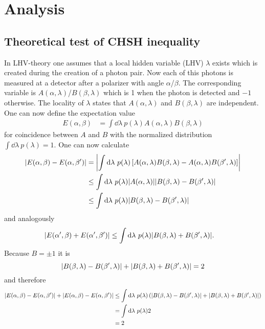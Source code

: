 \section{Analysis}
\subsection{Theoretical test of CHSH inequality}
In LHV-theory one assumes that a local hidden variable (LHV) $\lambda$ exists which is created during the creation of a photon pair.
Now each of this photons is measured at a detector after a polarizer with angle $\alpha$/$\beta$.
The corresponding variable is $A(\alpha,\lambda)$/$B(\beta,\lambda)$ which is 1 when the photon is detected and $-1$ otherwise.
The locality of $\lambda$ states that $A(\alpha,\lambda)$ and $B(\beta,\lambda)$ are independent.
One can now define the expectation value
\begin{align}
E(\alpha,\beta)
    &=\int \dd \lambda\ p(\lambda)A(\alpha,\lambda)B(\beta,\lambda)
    \label{eq:a:defE}
\end{align}
for coincidence between $A$ and $B$ with the normalized distribution $\int \dd\lambda\ p(\lambda)=1$.
One can now calculate
\begin{subequations}
\label{eq:a:Eab-Eab'}
\begin{align}
\abs{E(\alpha,\beta)-E(\alpha,\beta')}
    &=\abs{\int \dd \lambda\ p(\lambda)\left[A(\alpha,\lambda)B(\beta,\lambda)-A(\alpha,\lambda)B(\beta',\lambda)\right]}
    \label{eq:a:Eab-Eab':1}\\
    &\leq \int \dd \lambda\ p(\lambda)\abs{A(\alpha,\lambda)}\abs{B(\beta,\lambda)-B(\beta',\lambda)}
    \label{eq:a:Eab-Eab':2}\\
    &\leq \int \dd \lambda\ p(\lambda)\abs{B(\beta,\lambda)-B(\beta',\lambda)}
    \label{eq:a:Eab-Eab':3}
\end{align}
\end{subequations}
and analogously
\begin{align}
\abs{E(\alpha',\beta)+E(\alpha',\beta')}
    &\leq \int \dd \lambda\ p(\lambda)\abs{B(\beta,\lambda)+B(\beta',\lambda)}.
    \label{eq:a:Ea'b-Ea'b'}
\end{align}
Because $B=\pm 1$ it is
\begin{equation}
\abs{B(\beta,\lambda)-B(\beta',\lambda)}+\abs{B(\beta,\lambda)+B(\beta',\lambda)}=2
\label{eq:a:B+B}
\end{equation}
and therefore
\begin{subequations}
\label{eq:a:E+E}
\begin{align}
\abs{E(\alpha,\beta)-E(\alpha,\beta')}+\abs{E(\alpha,\beta)-E(\alpha,\beta')}
    &\leq \int \dd \lambda\ p(\lambda)\left(\abs{B(\beta,\lambda)-B(\beta',\lambda)}+\abs{B(\beta,\lambda)+B(\beta',\lambda)}\right)
    \label{eq:a:E+E:1}\\
    &= \int \dd \lambda\ p(\lambda)2
    \label{eq:a:E+E:2}\\
    &= 2
    \label{eq:a:E+E:3}
\end{align}
\end{subequations}

